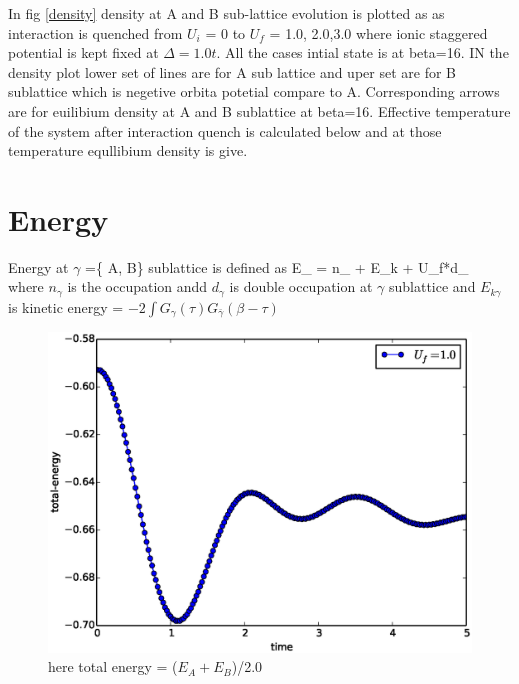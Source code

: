 In fig \ref{density} density at A and B sub-lattice evolution is plotted as as interaction is quenched from $U_i$ = 0 to $U_f$ = 1.0, 2.0,3.0 where ionic staggered potential is kept fixed at $\Delta=1.0t$. All the cases intial state is at beta=16. IN the density plot lower set of lines are for A sub lattice and uper set are for B sublattice which is negetive orbita potetial compare to A. Corresponding arrows are for euilibium density at A and B sublattice at beta=16. Effective temperature of the system after interaction quench is calculated below and at those temperature equllibium density is give.

\section{Energy}
Energy at $\gamma$ =\{ A, B\}  sublattice is defined as
\be 
E_{\gamma} = \Delta * n_{\gamma} + E_{k\gamma} + U_f*d_{\gamma}\\
\en 
where $n_{\gamma}$ is the occupation andd $d_{\gamma}$ is double occupation at $\gamma$ sublattice and $E_{k\gamma}$ is kinetic energy = $-2\int G_{\gamma}(\tau) G_{\bar{\gamma}}(\beta - \tau)$

\begin{figure}[H]
\includegraphics[width=0.8\linewidth]{interaction_quench/total-energy_new1.eps}
  \caption{here total energy = ($E_A + E_B$)/2.0}
\end{figure}



